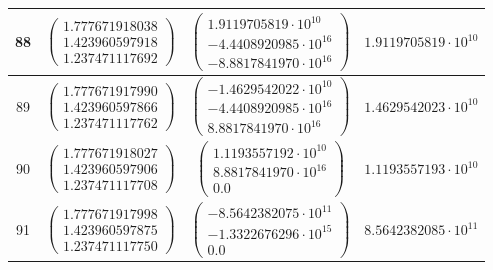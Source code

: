 \documentclass{article}
\begin{document}
\begin{table}[htb]
\begin{tabular}{|c|c|c|c|}
        88     & $\begin{pmatrix} 1.777671918038 \\ 1.423960597918 \\ 1.237471117692 \end{pmatrix}$ & $\begin{pmatrix} 1.9119705819\cdot 10^{10}  \\ -4.4408920985\cdot 10^{16} \\ -8.8817841970\cdot 10^{16} \end{pmatrix}$ & $ 1.9119705819\cdot 10^{10} $ \\ \hline
        89     & $\begin{pmatrix} 1.777671917990 \\ 1.423960597866 \\ 1.237471117762 \end{pmatrix}$ & $\begin{pmatrix} -1.4629542022\cdot 10^{10} \\ -4.4408920985\cdot 10^{16} \\ 8.8817841970\cdot 10^{16}  \end{pmatrix}$ & $ 1.4629542023\cdot 10^{10} $ \\ \hline
        90     & $\begin{pmatrix} 1.777671918027 \\ 1.423960597906 \\ 1.237471117708 \end{pmatrix}$ & $\begin{pmatrix} 1.1193557192\cdot 10^{10}  \\ 8.8817841970\cdot 10^{16}  \\ 0.0                        \end{pmatrix}$ & $ 1.1193557193\cdot 10^{10} $ \\ \hline
        91     & $\begin{pmatrix} 1.777671917998 \\ 1.423960597875 \\ 1.237471117750 \end{pmatrix}$ & $\begin{pmatrix} -8.5642382075\cdot 10^{11} \\ -1.3322676296\cdot 10^{15} \\ 0.0                        \end{pmatrix}$ & $ 8.5642382085\cdot 10^{11} $ \\ \hline
      \end{tabular}
    \end{table}
\end{document}
